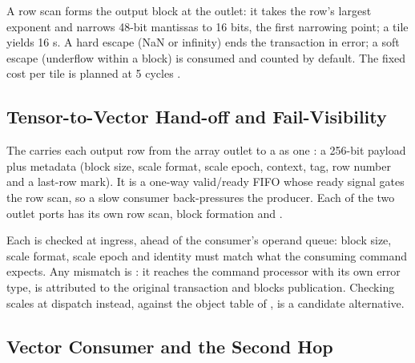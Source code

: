 %
A row scan forms the output block at the outlet: it takes the row's largest exponent and narrows 48-bit mantissas to 16 bits, the first narrowing point; a tile yields 16 \capsule{}s.
A hard escape (NaN or infinity) ends the transaction in error; a soft escape (underflow within a block) is consumed and counted by default.
The fixed cost per tile is planned at 5 cycles
.

\subsection{Tensor-to-Vector Hand-off and Fail-Visibility}\label{sec:handoff}

%
The \FastPath carries each output row from the array outlet to a \VectorCore as one \capsule: a 256-bit payload plus metadata (block size, scale format, scale epoch, context, tag, row number and a last-row mark).
It is a one-way valid/ready FIFO whose ready signal gates the row scan, so a slow consumer back-pressures the producer.
Each of the two outlet ports has its own row scan, block formation and \FastPath
{}.

%
Each \capsule is checked at ingress, ahead of the consumer's operand queue: block size, scale format, scale epoch and identity must match what the consuming command expects.
Any mismatch is \failvisible: it reaches the command processor with its own error type, is attributed to the original transaction and blocks publication.
Checking scales at dispatch instead, against the object table of , is a candidate alternative.

\subsection{Vector Consumer and the Second Hop}\label{sec:consumer}


